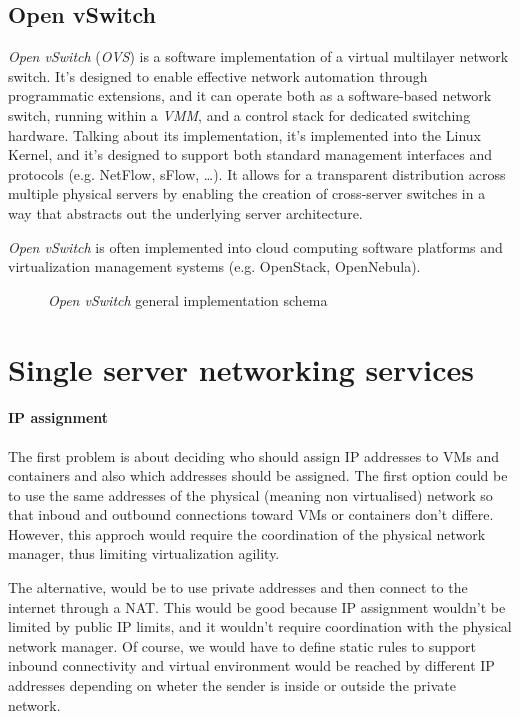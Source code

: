 \subsection{Open vSwitch}
\emph{Open vSwitch} (\emph{OVS}) is a software implementation of a virtual
multilayer network switch. It's designed to enable effective network automation
through programmatic extensions, and it can operate both as a software-based
network switch, running within a \emph{VMM}, and a control stack for dedicated
switching hardware. Talking about its implementation, it's implemented into the
Linux Kernel, and it's designed to support both standard management interfaces
and protocols (e.g. NetFlow, sFlow, \dots). It allows for a transparent
distribution across multiple physical servers by enabling the creation of
cross-server switches in a way that abstracts out the underlying server
architecture.

\begin{note}
    \emph{Open vSwitch} is often implemented into cloud computing software
    platforms and virtualization management systems (e.g. OpenStack, OpenNebula).
\end{note}

\begin{figure}[h!]
    \centering
    \caption{\emph{Open vSwitch} general implementation schema}
\end{figure}

\section{Single server networking services}
\paragraph{IP assignment}
The first problem is about deciding who should assign IP addresses to VMs and
containers and also which addresses should be assigned. The first option could
be to use the same addresses of the physical (meaning non virtualised) network
so that inboud and outbound connections toward VMs or containers don't differe.
However, this approch would require the coordination of the physical network
manager, thus limiting virtualization agility.

The alternative, would be to use private addresses and then connect to the
internet through a NAT. This would be good because IP assignment wouldn't
be limited by public IP limits, and it wouldn't require coordination with the
physical network manager. Of course, we would have to define static rules to
support inbound connectivity and virtual environment would be reached by
different IP addresses depending on wheter the sender is inside or outside the
private network.

